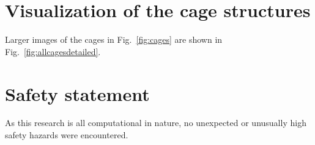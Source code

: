 \documentclass[journal=jacsat,manuscript=article]{achemso}
\begin{document}
\newpage
\clearpage


\section{Visualization of the cage structures}
Larger images of the cages in Fig.~\ref{fig:cages} are shown in Fig.~\ref{fig:allcagesdetailed}.
\captionsetup[subfigure]{labelformat=empty} %


\newpage
\clearpage


\section{Safety statement}
As this research is all computational in nature, no unexpected or unusually high safety hazards were encountered.

\clearpage


\end{document}
